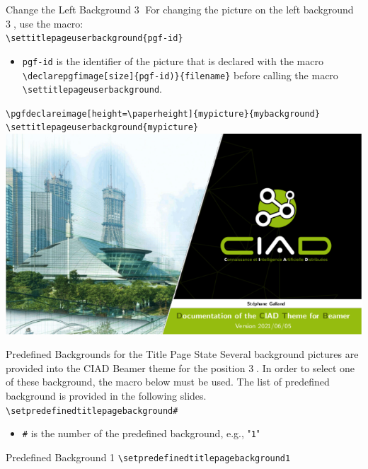 \documentclass[english,sectioncirclenumberstyle]{ciadbeamer}
\begin{document}
\begin{frame}[t]{Change the Left Background \textcircled{3}}
	\smaller For changing the picture on the left background \textcircled{3}, use the macro: \\[.25cm]
	\texttt{{\textbackslash}settitlepageuserbackground\{pgf-id\}} \\[.25cm]
	\begin{itemize}
		\item \texttt{pgf-id} is the identifier of the picture that is declared with the macro \texttt{{\textbackslash}declarepgfimage[size]\{pgf-id)\}\{filename\}} before calling the macro \texttt{{\textbackslash}settitlepageuserbackground}.
	\end{itemize}
	\begin{example}
		\texttt{{\textbackslash}pgfdeclareimage[height={\textbackslash}paperheight]\{mypicture\}\{mybackground\}} \\
		\texttt{{\textbackslash}settitlepageuserbackground\{mypicture\}} \\
		\centering\includegraphics[width=.25\linewidth]{frontpage3}
	\end{example}
\end{frame}

\begin{frame}{{Predefined Backgrounds} for the Title Page State}
	Several background pictures are provided into the CIAD Beamer theme for the position \textcircled{3}. In order to select one of these background, the macro below must be used. The list of predefined background is provided in the following slides. \\[.5cm]
	\texttt{{\textbackslash}setpredefinedtitlepagebackground{\#}} \\[.5cm]
	\begin{itemize}
		\item \texttt{\#} is the number of the predefined background, e.g., "\texttt{1}"
	\end{itemize}
\end{frame}

\begin{frame}{{Predefined Background} 1}
	\centering\texttt{{\textbackslash}setpredefinedtitlepagebackground1} \\[.5cm]
\end{frame}
\end{document}
